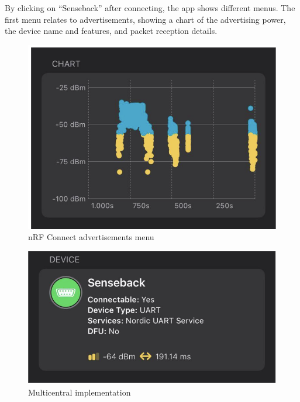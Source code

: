 \documentclass{Configuration_Files/PoliMi3i_thesis}
\begin{document}
By clicking on “Senseback” after connecting, the app shows different menus. The first menu relates to advertisements, showing a chart of the advertising power, the device name and features, and packet reception details.

\begin{figure}[H]
    \centering
    \includegraphics[scale=0.6]{Multicentral/8.png}
    \caption{nRF Connect advertisements menu}
    \label{multicentral_8}
\end{figure}

\begin{figure}[H]
    \centering
    \includegraphics[scale=0.6]{Multicentral/9.png}
    \caption{Multicentral implementation}
    \label{multicentral_9}
\end{figure}
\end{document}
